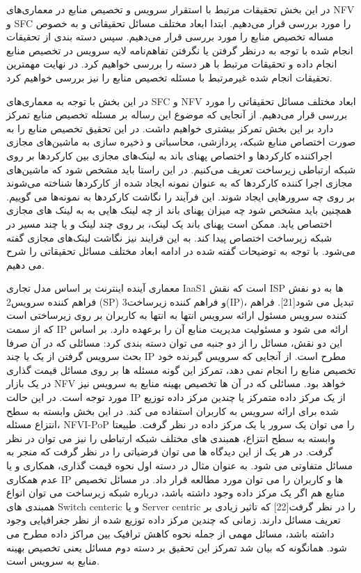 

در این بخش تحقیقات مرتبط با استقرار سرویس و تخصیص منابع در معماری‌های NFV و SFC را مورد بررسی قرار می‌دهیم.
ابتدا ابعاد مختلف مسائل تحقیقاتی و به خصوص مساله تخصیص منابع را مورد بررسی قرار می‌دهیم.
سپس دسته بندی از تحقیقات انجام شده با توجه به درنظر گرفتن یا نگرفتن تفاهم‌نامه لایه سرویس در تخصیص منابع انجام داده و تحقیقات مرتبط با هر دسته را بررسی خواهیم کرد. در نهایت مهمترین تحقیقات انجام شده غیرمرتبط با مسئله تخصیص منابع را نیز بررسی خواهیم کرد.


در این بخش با توجه به معماری‌های SFC و NFV ابعاد مختلف مسائل تحقیقاتی را مورد بررسی قرار می‌دهیم.
از آنجایی که موضوع این رساله بر مسئله تخصیص منابع تمرکز دارد بر این بخش تمرکز بیشتری خواهیم داشت. در این تحقیق تخصیص منابع را به صورت اختصاص منابع شبکه، پردازشی، محاسباتی و ذخیره سازی به ماشین‌های
مجازی اجراکننده کارکردها و اختصاص پهنای باند به لینک‌های مجازی بین کارکردها بر روی شبکه ارتباطی زیرساخت تعریف می‌کنیم.
در این راستا باید مشخص شود که ماشین‌های مجازی اجرا کننده کارکردها که به عنوان نمونه ایجاد شده از کارکردها شناخته می‌شوند بر روی چه سرورهایی ایجاد شوند.
این فرآیند را نگاشت کارکردها به نمونه‌ها می گوییم. همچنین باید مشخص شود چه میزان پهنای باند از چه لینک هایی به به لینک های مجازی اختصاص یابد.
ممکن است پهنای باند یک لینک، بر روی چند لینک و یا چند مسیر در شبکه زیرساخت اختصاص پیدا کند. به این فرایند نیز نگاشت لینک‌های مجازی گفته می‌شود.
با توجه به توضیحات گفته شده در ادامه ابعاد مختلف مسائل تحقیقاتی را شرح می دهیم.


معماری آینده اینترنت بر اساس مدل تجاری IaaS1 است که نقش ISP ها به دو نفش فراهم کننده سرویس2 (SP) و فراهم کننده زیرساخت3(IP)، تبدیل می شود[21]. فراهم کننده سرویس مسئول ارائه سرویس انتها به انتها به کاربران بر روی زیرساختی است که از سمت IP ارائه می شود و مسئولیت مدیریت منابع آن را برعهده دارد. بر اساس این دو نقش، مسائل را از دو جنبه می توان دسته بندی کرد:
 مسائلی که در آن صرفا بحث سرویس گرفتن از یک یا چند IP مطرح است. از آنجایی که سرویس گیرنده خود تخصیص منابع را انجام نمی دهد، تمرکز این گونه مسئله ها بر روی مسائل قیمت گذاری در یک بازار NFV خواهد بود.
 مسائلی که در آن ها تخصیص بهینه منابع به سرویس نیز مورد توجه است. در این حالت IP از یک مرکز داده متمرکز یا چندین مرکز داده توزیع شده برای ارائه سرویس به کاربران استفاده می کند.  در این بخش وابسته به سطح  انتزاع مسئله، NFVI-PoP را می توان یک سرور یا یک مرکز داده در نظر گرفت. طبیعتا وابسته به سطح انتزاع، همبندی های مختلف شبکه ارتباطی را نیز می توان در نظر گرفت.
در هر یک از این دیدگاه ها می توان فرضیاتی را در نظر گرفت که منجر به مسائل متفاوتی می شود. به عنوان مثال در دسته اول نحوه قیمت گذاری، همکاری و یا عدم همکاری IP ها و کاربران را می توان مورد مطالعه قرار داد. در مسائل تخصیص منابع هم اگر یک مرکز داده وجود داشته باشد، درباره شبکه زیرساخت می توان انواع همبندی های Switch centeric و یا Server centric را در نظر گرفت[22] که تاثیر زیادی بر تعریف مسائل دارند. زمانی که چندین مرکز داده توزیع شده از نظر جغرافیایی وجود داشته باشد، مسائل مهمی از جمله نحوه کاهش ترافیک بین مراکز داده مطرح می شود. همانگونه که بیان شد تمرکز این تحقیق بر دسته دوم مسائل یعنی تخصیص بهینه منابع به سرویس است.


